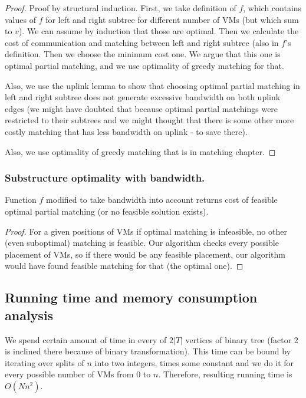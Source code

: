 \begin{proof}
Proof by structural induction. First, we take definition of $f$, which
contains values of $f$ for left and right subtree for different number
of VMs (but which sum to $v$). We can assume by induction that those
are optimal. Then we calculate the cost of communication and matching
between left and right subtree (also in $f$'s definition. Then we
choose the minimum cost one. We argue that this one is optimal partial
matching, and we use optimality of greedy matching for that.

Also, we use the uplink lemma to show that choosing optimal partial
matching in left and right subtree does not generate excessive
bandwidth on both uplink edges (we might have doubted that because
optimal partial matchings were restricted to their subtrees and we
might thought that there is some other more costly matching that has
less bandwidth on uplink - to save there).

Also, we use optimality of greedy matching that is in matching
chapter.
\end{proof}

\subsubsection{Substructure optimality with bandwidth.}
\begin{lemma}
Function $f$ modified to take bandwidth into account returns cost of feasible optimal partial matching (or no feasible solution exists).
\end{lemma}

\begin{proof}

For a given positions of VMs if optimal matching is infeasible, no other (even suboptimal) matching is feasible. Our algorithm checks every possible placement of VMs, so if there would be any feasible placement, our algorithm would have found feasible matching for that (the optimal one).

\end{proof}
\subsection{Running time and memory consumption analysis}

We spend certain amount of time in every of $2|T|$ vertices of binary
tree (factor 2 is inclined there because of binary
transformation). This time can be bound by iterating over splits of
$n$ into two integers, times some constant and we do it for every
possible number of VMs from $0$ to $n$. Therefore, resulting running
time is $O(Nn^2)$.

